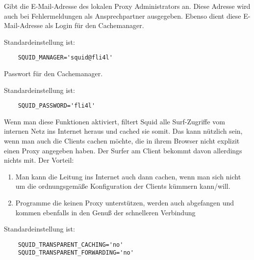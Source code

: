 \begin{description}

                Gibt die \mbox{E-Mail}-Adresse des lokalen Proxy Administrators an.
                Diese Adresse wird auch bei Fehlermeldungen als Ansprechpartner
                ausgegeben. Ebenso dient diese \mbox{E-Mail}-Adresse als Login für den
                Cachemanager.

                Standardeinstellung ist:
\begin{verbatim}
	SQUID_MANAGER='squid@fli4l'
\end{verbatim}



                Passwort für den Cachemanager.

                Standardeinstellung ist:
\begin{verbatim}
	SQUID_PASSWORD='fli4l'
\end{verbatim}



                Wenn man diese Funktionen aktiviert, filtert Squid alle
                \dq{}Surf-Zugriffe\dq{} vom internen Netz ins Internet heraus und
                cached sie somit. Das kann nützlich sein, wenn man auch die
                Clients cachen möchte, die in ihrem Browser nicht explizit
                einen Proxy angegeben haben. Der Surfer am Client bekommt
                davon allerdings nichts mit. Der Vorteil:
\begin{enumerate}
    \item{ Man kann die Leitung ins Internet auch dann cachen,
           wenn man sich nicht um die ordnungsgemäße
           Konfiguration der Clients kümmern kann/will.}
    \item{ Programme die keinen Proxy unterstützen, werden
           auch abgefangen und kommen ebenfalls in den Genuß
           der \dq{}schnelleren Verbindung\dq{}}
\end{enumerate}

                Standardeinstellung ist:
\begin{verbatim}
	SQUID_TRANSPARENT_CACHING='no'
	SQUID_TRANSPARENT_FORWARDING='no'
\end{verbatim}


\end{description}
